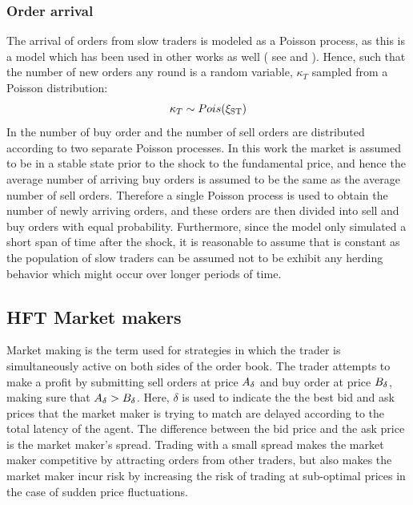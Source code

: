 \subsubsection{Order arrival}
The arrival of orders from slow traders is modeled as a Poisson process, as this is a model which has been used in other works as well ( see \cite{cincotti2006waiting} and \cite{amihud1980dealership}). Hence, such that the number of new orders any round  is a random variable, $\kappa_T$ sampled from a Poisson distribution:
\begin{equation}\label{eq:poisson_distribution}
\kappa_T \sim Pois(\xi_\text{ST})
\end{equation}
In \cite{amihud1980dealership} the number of buy order and the number of sell orders are distributed according to two separate Poisson processes. In this work the market is assumed to be in a stable state prior to the shock to the fundamental price, and hence the average number of arriving buy orders is assumed to be the same as the average number of sell orders. Therefore a single Poisson process is used to obtain the number of newly arriving orders, and these orders are then divided into sell and buy orders with equal probability. Furthermore, since the model only simulated a short span of time after the shock, it is reasonable to assume that \avrstorders{} is constant as the population of slow traders can be assumed not to be exhibit any herding behavior which might occur over longer periods of time.


\subsection{HFT Market makers}\label{section:market_maker}
Market making is the term used for strategies in which the trader is simultaneously active on both sides of the order book. The trader attempts to make a profit by submitting sell orders at price $A_{\delta}$ and buy order at price $B_{\delta}$, making sure that $A_{\delta} > B_{\delta}$. Here, $\delta$ is used to indicate the the best bid and ask prices that the market maker is trying to match are delayed according to the total latency of the agent. The difference between the bid price and the ask price is the market maker's spread. Trading with a small spread makes the market maker competitive by attracting orders from other traders, but also makes the market maker incur risk by increasing the risk of trading at sub-optimal prices in the case of sudden price fluctuations. 

